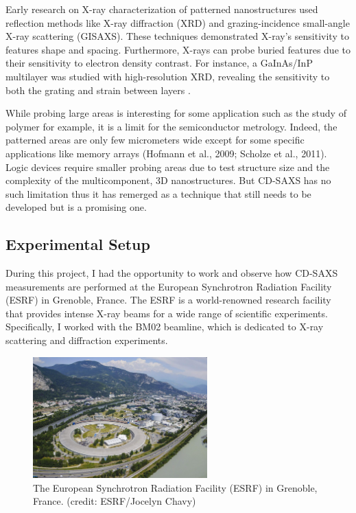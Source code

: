\medskip
Early research on X-ray characterization of patterned nanostructures used reflection
methods like X-ray diffraction (XRD) and grazing-incidence small-angle X-ray scattering (GISAXS). 
These techniques demonstrated X-ray's sensitivity to features shape and spacing.
Furthermore, X-rays can probe buried features due to their sensitivity to electron density contrast. For instance, a GaInAs/InP multilayer was studied with high-resolution XRD, revealing 
the sensitivity to both the grating and strain between layers \cite{Baumbach_Lübbert_Gailhanou_2000}.

\medskip

While probing large areas is interesting for some application such as the study of polymer for example, it is a limit for 
the semiconductor metrology. Indeed, the patterned areas are only few micrometers wide except for some specific applications like memory arrays (Hofmann et al.,
2009; Scholze et al., 2011). Logic devices require smaller probing areas due to test structure 
size and the complexity of the multicomponent, 3D nanostructures. But CD-SAXS has no such limitation thus it has remerged as a technique that still needs to be developed but is a promising one.\cite{phd_freychet}

\medskip




\subsection{Experimental Setup}

During this project, I had the opportunity to work and observe how CD-SAXS 
measurements are performed at the European Synchrotron Radiation Facility (ESRF)
in Grenoble, France. The ESRF is a world-renowned research facility that provides
intense X-ray beams for a wide range of scientific experiments. Specifically,
I worked with the BM02 beamline, which is dedicated to X-ray scattering and
   diffraction experiments.

\begin{figure}[h]
\centering
\includegraphics[width=0.6\textwidth]{images/esrf.jpg}
\caption{The European Synchrotron Radiation Facility (ESRF) in Grenoble, France. (credit: ESRF/Jocelyn Chavy)}
\label{fig
}
\end{figure}

